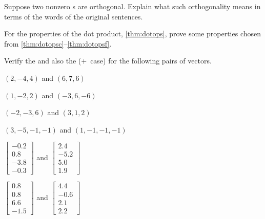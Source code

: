 \begin{exercise}  
Suppose two nonzero s are orthogonal.  
Explain what such orthogonality means in terms of the words of the original sentences.
\end{exercise}






\begin{exercise} \label{ex:dotops} 
For the properties of the dot product, \cref{thm:dotops}, prove some properties chosen from \ref{thm:dotopsc}--\ref{thm:dotopsf}.
\end{exercise}



\begin{exercise}  
Verify the  and also the  (\(+\)~case) for the following pairs of vectors.
\begin{Parts}
\item \((2,-4,4)\) and \((6,7,6)\)
\item \((1,-2,2)\) and \((-3,6,-6)\)
\begin{reduce}
\item \((-2,-3,6)\) and \((3,1,2)\)
\item \((3,-5,-1,-1)\) and \((1,-1,-1,-1)\)
\end{reduce}
\item \(\begin{bmatrix} -0.2\\0.8\\-3.8\\-0.3 \end{bmatrix}\) and 
\(\begin{bmatrix} 2.4\\-5.2\\5.0\\1.9 \end{bmatrix}\)
\item \(\begin{bmatrix} 0.8\\0.8\\6.6\\-1.5 \end{bmatrix}\) and 
\(\begin{bmatrix} 4.4\\-0.6\\2.1\\2.2 \end{bmatrix}\)
\end{Parts}
\end{exercise}


